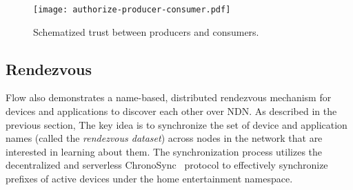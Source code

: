 \begin{figure}[!t]
\centering
\texttt{[image: authorize-producer-consumer.pdf]}
\caption{Schematized trust between producers and consumers.}
\label{fig:flow-app-authorization-trust-relationship}
\end{figure}


\subsection{Rendezvous}
\label{sec:rendezvous}


Flow also demonstrates a name-based, distributed rendezvous mechanism for devices and applications to discover each other over NDN.
As described in the previous section, The key idea is to synchronize the set of device and application names (called the \textit{rendezvous dataset}) across nodes in the network that are interested in learning about them.
The synchronization process utilizes the decentralized and serverless ChronoSync~\cite{chronosync} protocol to effectively synchronize prefixes of active devices under the home entertainment  namespace.

